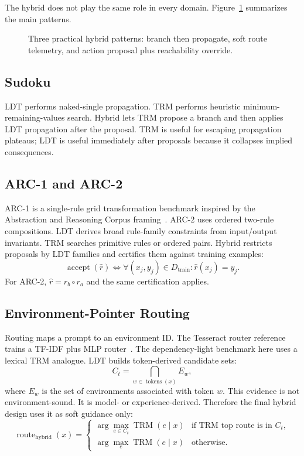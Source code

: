 \documentclass[11pt]{article}
\begin{document}
The hybrid does not play the same role in every domain. Figure~\ref{fig:patterns} summarizes the main patterns.

\begin{figure}[t]
\centering

\caption{Three practical hybrid patterns: branch then propagate, soft route telemetry, and action proposal plus reachability override.}
\label{fig:patterns}
\end{figure}

\subsection{Sudoku}

LDT performs naked-single propagation. TRM performs heuristic minimum-remaining-values search. Hybrid lets TRM propose a branch and then applies LDT propagation after the proposal. TRM is useful for escaping propagation plateaus; LDT is useful immediately after proposals because it collapses implied consequences.

\subsection{ARC-1 and ARC-2}

ARC-1 is a single-rule grid transformation benchmark inspired by the Abstraction and Reasoning Corpus framing~\cite{chollet2019measure}. ARC-2 uses ordered two-rule compositions. LDT derives broad rule-family constraints from input/output invariants. TRM searches primitive rules or ordered pairs. Hybrid restricts proposals by LDT families and certifies them against training examples:
\[
  \operatorname{accept}(\hat r)
  \iff
  \forall (x_j,y_j)\in D_{\text{train}}:\hat r(x_j)=y_j.
\]
For ARC-2, $\hat r = r_b \circ r_a$ and the same certification applies.

\subsection{Environment-Pointer Routing}

Routing maps a prompt to an environment ID. The Tesseract router reference trains a TF-IDF plus MLP router~\cite{tesseract2026router}. The dependency-light benchmark here uses a lexical TRM analogue. LDT builds token-derived candidate sets:
\[
  C_t = \bigcap_{w\in \operatorname{tokens}(x)} E_w,
\]
where $E_w$ is the set of environments associated with token $w$. This evidence is not environment-sound. It is model- or experience-derived. Therefore the final hybrid design uses it as soft guidance only:
\[
\operatorname{route}_{\text{hybrid}}(x)=
\begin{cases}
\arg\max_{e\in C_t}\operatorname{TRM}(e\mid x) &
\text{if TRM top route is in } C_t,\\
\arg\max_e \operatorname{TRM}(e\mid x) & \text{otherwise.}
\end{cases}
\]
\end{document}
